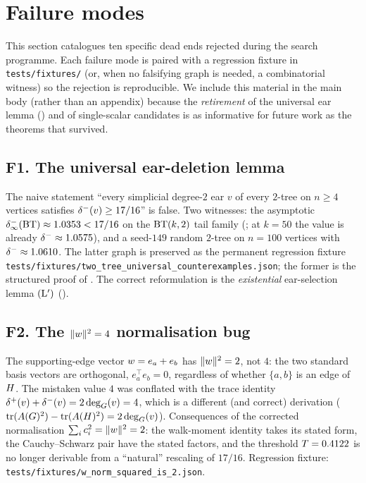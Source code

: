 \section{Failure modes}\label{sec:failure-modes}

This section catalogues ten specific dead ends rejected during the
search programme. Each failure mode is paired with a regression fixture
in \texttt{tests/fixtures/} (or, when no falsifying graph is needed, a
combinatorial witness) so the rejection is reproducible. We include
this material in the main body (rather than an appendix) because the
\emph{retirement} of the universal ear lemma ()
and of single-scalar candidates is as informative for future work as
the theorems that survived.

\subsection{F1. The universal ear-deletion lemma}\label{sec:fm:universal}

The naive statement ``every simplicial degree-$2$ ear $v$ of every
$2$-tree on $n \ge 4$ vertices satisfies $\delta^{-}(v) \ge 17/16$'' is
false. Two witnesses: the asymptotic $\delta^{-}_{\infty}(\mathrm{BT}) \approx
1.0353 < 17/16$ on the $\mathrm{BT}(k,2)$ tail family
(; at $k = 50$ the value is already
$\delta^{-} \approx 1.0575$), and a seed-$149$ random $2$-tree on
$n = 100$ vertices with $\delta^{-} \approx 1.0610$. The latter graph is
preserved as the permanent regression fixture
\texttt{tests/fixtures/two\_tree\_universal\_counterexamples.json}; the
former is the structured proof of . The
correct reformulation is the \emph{existential} ear-selection lemma
$(\mathrm{L}')$ ().

\subsection{F2. The $\|w\|^{2} = 4$ normalisation bug}\label{sec:fm:wnorm}

The supporting-edge vector $w = e_{a} + e_{b}$ has
$\|w\|^{2} = 2$, not $4$: the two standard basis vectors are
orthogonal, $e_{a}^{\top} e_{b} = 0$, regardless of whether
$\{a, b\}$ is an edge of $H$. The mistaken value $4$ was
conflated with the trace identity $\delta^{+}(v) + \delta^{-}(v) = 2\deg_{G}(v) = 4$,
which is a different (and correct) derivation
($\operatorname{tr}(A(G)^{2}) - \operatorname{tr}(A(H)^{2}) = 2 \deg_{G}(v)$).
Consequences of the corrected normalisation
$\sum_{i} c_{i}^{2} = \|w\|^{2} = 2$: the walk-moment identity
 takes its stated form, the Cauchy--Schwarz pair
 have the stated factors, and the
threshold $T = 0.4122$ is no longer derivable from a
``natural'' rescaling of $17/16$. Regression fixture:
\texttt{tests/fixtures/w\_norm\_squared\_is\_2.json}.

